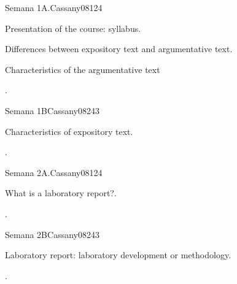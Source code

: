 \begin{syllabus}
\begin{competences}
    \item {}
\end{competences}

\begin{unit}{Semana 1A.}{}{Cassany08}{12}{4}
   \begin{topics}
      \item Presentation of the course: syllabus.
      \item Differences between expository text and argumentative text.
      \item Characteristics of the argumentative text
   \end{topics}
   \begin{learningoutcomes}
      \item .
   \end{learningoutcomes}
\end{unit}

\begin{unit}{Semana 1B}{}{Cassany08}{24}{3}
   \begin{topics}
      \item Characteristics of expository text.
   \end{topics}

   \begin{learningoutcomes}
      \item . 
      \end{learningoutcomes}
\end{unit}

\begin{unit}{Semana 2A.}{}{Cassany08}{12}{4}
   \begin{topics}
      \item What is a laboratory report?.
   \end{topics}
   \begin{learningoutcomes}
      \item .
   \end{learningoutcomes}
\end{unit}

\begin{unit}{Semana 2B}{}{Cassany08}{24}{3}
   \begin{topics}
      \item Laboratory report: laboratory development or methodology.
   \end{topics}

   \begin{learningoutcomes}
      \item .
      \end{learningoutcomes}
\end{unit}


\end{syllabus}
